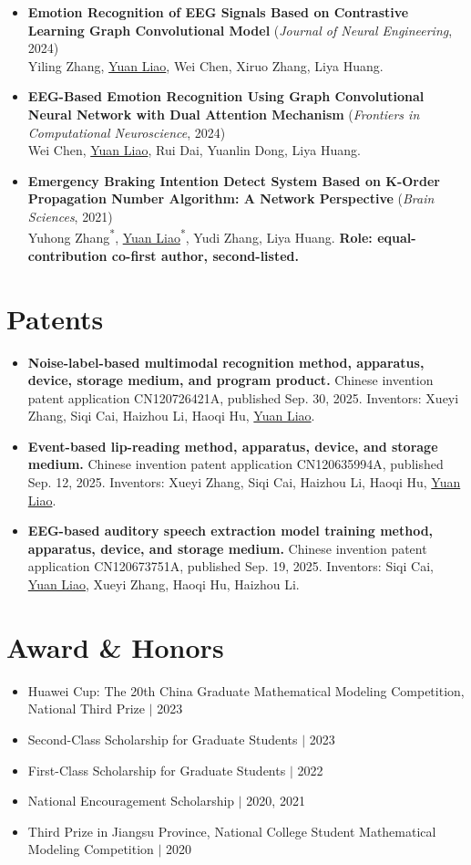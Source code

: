\documentclass[letterpaper,10pt]{article}
\newcommand{\resumeItem}[1]{\item\small{#1 \vspace{-2pt}}}
\newcommand{\publication}[3]{
	\item \small{
		\textbf{#1} #2\\
		#3
	}\vspace{-2pt}
}
\begin{document}
\begin{itemize}[leftmargin=0.15in]
		\publication
		{Emotion Recognition of EEG Signals Based on Contrastive Learning Graph Convolutional Model}
		{(\textit{Journal of Neural Engineering}, 2024)}
		{Yiling Zhang, \underline{Yuan Liao}, Wei Chen, Xiruo Zhang, Liya Huang.}
		
		\publication
		{EEG-Based Emotion Recognition Using Graph Convolutional Neural Network with Dual Attention Mechanism}
		{(\textit{Frontiers in Computational Neuroscience}, 2024)}
		{Wei Chen, \underline{Yuan Liao}, Rui Dai, Yuanlin Dong, Liya Huang.}
		
		\publication
		{Emergency Braking Intention Detect System Based on K-Order Propagation Number Algorithm: A Network Perspective}
		{(\textit{Brain Sciences}, 2021)}
		{Yuhong Zhang\textsuperscript{*}, \underline{Yuan Liao}\textsuperscript{*}, Yudi Zhang, Liya Huang. \textbf{Role: equal-contribution co-first author, second-listed.}}
		
	\end{itemize}
	
	
	\section{Patents}
	\begin{itemize}[leftmargin=0.15in]
		\resumeItem{\textbf{Noise-label-based multimodal recognition method, apparatus, device, storage medium, and program product.} Chinese invention patent application CN120726421A, published Sep. 30, 2025. Inventors: Xueyi Zhang, Siqi Cai, Haizhou Li, Haoqi Hu, \underline{Yuan Liao}.}
		\resumeItem{\textbf{Event-based lip-reading method, apparatus, device, and storage medium.} Chinese invention patent application CN120635994A, published Sep. 12, 2025. Inventors: Xueyi Zhang, Siqi Cai, Haizhou Li, Haoqi Hu, \underline{Yuan Liao}.}
		\resumeItem{\textbf{EEG-based auditory speech extraction model training method, apparatus, device, and storage medium.} Chinese invention patent application CN120673751A, published Sep. 19, 2025. Inventors: Siqi Cai, \underline{Yuan Liao}, Xueyi Zhang, Haoqi Hu, Haizhou Li.}
	\end{itemize}
	
	\section{Award \& Honors}
	\begin{itemize}[leftmargin=0.15in]
		\resumeItem{Huawei Cup: The 20th China Graduate Mathematical Modeling Competition, National Third Prize $|$ 2023}
		\resumeItem{Second-Class Scholarship for Graduate Students $|$ 2023}
		\resumeItem{First-Class Scholarship for Graduate Students $|$ 2022}
		\resumeItem{National Encouragement Scholarship $|$ 2020, 2021}
		\resumeItem{Third Prize in Jiangsu Province, National College Student Mathematical Modeling Competition $|$ 2020}
	\end{itemize}
	
\end{document}
